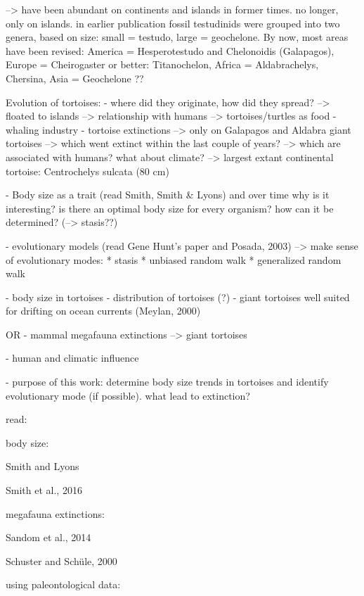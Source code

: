 --> have been abundant on continents and islands in former times. no longer, only on islands.
in earlier publication fossil testudinids were grouped into two genera, based on size: small = testudo, large = geochelone. 
By now, most areas have been revised: America = Hesperotestudo and Chelonoidis (Galapagos), Europe = Cheirogaster or better: Titanochelon, Africa = Aldabrachelys, Chersina, Asia = Geochelone ??

Evolution of tortoises:
- where did they originate, how did they spread?
--> floated to islands
--> relationship with humans --> tortoises/turtles as food - whaling industry
- tortoise extinctions --> only on Galapagos and Aldabra giant tortoises --> which went extinct within the last couple of years? --> which are associated with humans?
what about climate?
--> largest extant continental tortoise: Centrochelys sulcata (80 cm)






- Body size as a trait (read Smith, Smith \& Lyons) and over time
why is it interesting?
is there an optimal body size for every organism? how can it be determined? (--> stasis??)

- evolutionary models (read Gene Hunt's paper and Posada, 2003)
-->  make sense of evolutionary modes:
* stasis
* unbiased random walk
* generalized random walk


- body size in tortoises %
- distribution of tortoises (?)
- giant tortoises well suited for drifting on ocean currents (Meylan, 2000)

OR
- mammal megafauna extinctions --> giant tortoises

- human and climatic influence

- purpose of this work: determine body size trends in tortoises and identify evolutionary mode (if possible). what lead to extinction?




read:

body size:

Smith and Lyons

Smith et al., 2016

megafauna extinctions:

Sandom et al., 2014

Schuster and Schüle, 2000

using paleontological data:

